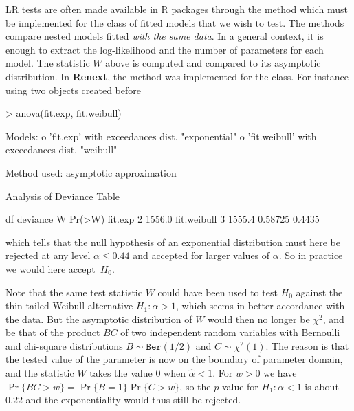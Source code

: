\documentclass[a4paper]{report}
\newcommand{\pkg}[1]{\textbf{#1}}
\begin{document}
LR tests are often made available in R packages through the
\verb@anova@ method which must be implemented for the class of fitted
models that we wish to test. The \verb@anova@ methods compare nested
models fitted \textit{with the same data}.  In a general context, it
is enough to extract the log-likelihood and the number of parameters
for each model. The  statistic $W$ above is computed and compared to its
asymptotic distribution.  In \pkg{Renext}, the \verb@anova@ method was
implemented for the \verb@Renouv@ class. For instance using two
\verb@Renouv@ objects created before 
\begin{Schunk}
\begin{Sinput}
> anova(fit.exp, fit.weibull)
\end{Sinput}
\begin{Soutput}
Models: 
  o 'fit.exp' with exceedances dist. "exponential"
  o 'fit.weibull' with exceedances dist. "weibull"

Method used:  asymptotic approximation 

Analysis of Deviance Table

            df deviance       W Pr(>W)
fit.exp      2   1556.0               
fit.weibull  3   1555.4 0.58725 0.4435
\end{Soutput}
\end{Schunk}

%

\noindent
which tells that the null hypothesis of an exponential distribution
must here be rejected at any level $\alpha \leqslant
0.44$ and
accepted for larger values of $\alpha$. So in practice we would here
accept~$H_0$.

Note that the same test statistic $W$ could have been used to test
$H_0$ against the thin-tailed Weibull alternative $H_1: \alpha >1$,
which seems in better accordance with the data. But the asymptotic
distribution of $W$ would then no longer be $\chi^2$, and be that of
the product $BC$ of two independent random variables with Bernoulli
and chi-square distributions $B \sim \texttt{Ber}(1/2)$ and $C \sim
\chi^2(1)$.
The reason is that the tested value of the parameter is now on the
boundary of parameter domain, and the statistic $W$ takes the value
$0$ when $\widehat{\alpha}<1$.  For $w >0$ we have $\Pr\{BC > w\} =
\Pr\{ B=1 \} \Pr\{ C > w \}$, so the $p$-value for $H_1: \alpha <1$ is
about 
$0.22$ 
and the exponentiality would thus still be rejected.

\end{document}
